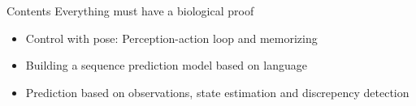 \begin{frame}[allowframebreaks]{Contents}
    Everything must have a biological proof
    
    
    \begin{itemize}
        \item Control with pose: Perception-action loop and memorizing
        \item Building a sequence prediction model based on language
        \item Prediction based on observations, state estimation and discrepency detection
    \end{itemize}
\end{frame}